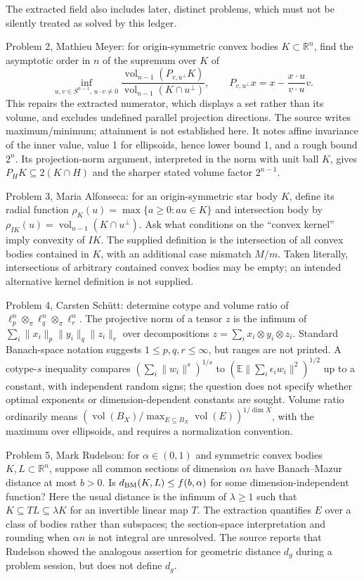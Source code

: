 \documentclass[11pt]{article}
\newcommand{\R}{\mathbb{R}}
\newcommand{\E}{\mathbb{E}}
\begin{document}
The extracted field also includes later, distinct problems, which must not be silently treated as solved by this ledger.

Problem 2, Mathieu Meyer: for origin-symmetric convex bodies \(K\subset\R^n\), find the asymptotic order in \(n\) of the supremum over \(K\) of
\[
\inf_{u,v\in S^{n-1},\,u\cdot v\ne0}\frac{\operatorname{vol}_{n-1}(P_{v,u^\perp}K)}{\operatorname{vol}_{n-1}(K\cap u^\perp)},\qquad P_{v,u^\perp}x=x-\frac{x\cdot u}{v\cdot u}v.
\]
This repairs the extracted numerator, which displays a set rather than its volume, and excludes undefined parallel projection directions. The source writes maximum/minimum; attainment is not established here. It notes affine invariance of the inner value, value 1 for ellipsoids, hence lower bound 1, and a rough bound \(2^n\). Its projection-norm argument, interpreted in the norm with unit ball \(K\), gives \(P_HK\subseteq2(K\cap H)\) and the sharper stated volume factor \(2^{n-1}\).

Problem 3, Maria Alfonseca: for an origin-symmetric star body \(K\), define its radial function \(\rho_K(u)=\max\{a\ge0:au\in K\}\) and intersection body by \(\rho_{IK}(u)=\operatorname{vol}_{n-1}(K\cap u^\perp)\). Ask what conditions on the ``convex kernel'' imply convexity of \(IK\). The supplied definition is the intersection of all convex bodies contained in \(K\), with an additional case mismatch \(M/m\). Taken literally, intersections of arbitrary contained convex bodies may be empty; an intended alternative kernel definition is not supplied.

Problem 4, Carsten Sch\"utt: determine cotype and volume ratio of \(\ell_p^n\otimes_\pi\ell_q^n\otimes_\pi\ell_r^n\). The projective norm of a tensor \(z\) is the infimum of \(\sum_i\|x_i\|_p\|y_i\|_q\|z_i\|_r\) over decompositions \(z=\sum_i x_i\otimes y_i\otimes z_i\). Standard Banach-space notation suggests \(1\le p,q,r\le\infty\), but ranges are not printed. A cotype-\(s\) inequality compares \((\sum_i\|w_i\|^s)^{1/s}\) to \((\E\|\sum_i\epsilon_iw_i\|^2)^{1/2}\) up to a constant, with independent random signs; the question does not specify whether optimal exponents or dimension-dependent constants are sought. Volume ratio ordinarily means \((\operatorname{vol}(B_X)/\max_{E\subseteq B_X}\operatorname{vol}(E))^{1/\dim X}\), with the maximum over ellipsoids, and requires a normalization convention.

Problem 5, Mark Rudelson: for \(\alpha\in(0,1)\) and symmetric convex bodies \(K,L\subset\R^n\), suppose all common sections of dimension \(\alpha n\) have Banach--Mazur distance at most \(b>0\). Is \(d_{\rm BM}(K,L)\le f(b,\alpha)\) for some dimension-independent function? Here the usual distance is the infimum of \(\lambda\ge1\) such that \(K\subseteq TL\subseteq\lambda K\) for an invertible linear map \(T\). The extraction quantifies \(E\) over a class of bodies rather than subspaces; the section-space interpretation and rounding when \(\alpha n\) is not integral are unresolved. The source reports that Rudelson showed the analogous assertion for geometric distance \(d_g\) during a problem session, but does not define \(d_g\).
\end{document}
